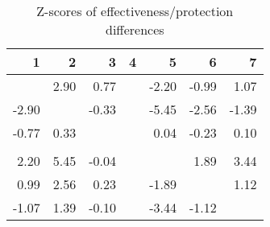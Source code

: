\begin{table}[ht]
\centering
\begin{tabular}{rrrrrrr}
  \hline
1 & 2 & 3 & 4 & 5 & 6 & 7 \\ 
  \hline
 & 2.90 & 0.77 &  & -2.20 & -0.99 & 1.07 \\ 
  -2.90 &  & -0.33 &  & -5.45 & -2.56 & -1.39 \\ 
  -0.77 & 0.33 &  &  & 0.04 & -0.23 & 0.10 \\ 
   &  &  &  &  &  &  \\ 
  2.20 & 5.45 & -0.04 &  &  & 1.89 & 3.44 \\ 
  0.99 & 2.56 & 0.23 &  & -1.89 &  & 1.12 \\ 
  -1.07 & 1.39 & -0.10 &  & -3.44 & -1.12 &  \\ 
   \hline
\end{tabular}
\caption{Z-scores of effectiveness/protection differences} 
\end{table}
